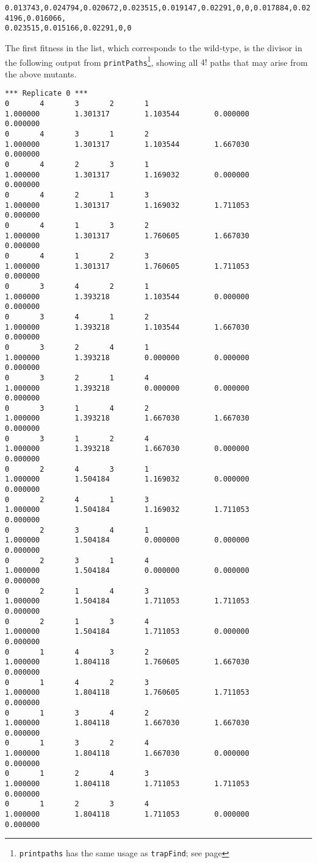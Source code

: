 \vspace{1ex}
\noindent
\texttt{0.013743,0.024794,0.020672,0.023515,0.019147,0.02291,0,0,0.017884,0.024196,0.016066,\\0.023515,0.015166,0.02291,0,0}
\vspace{1ex}


The first fitness in the list, which corresponds to the wild-type, is
the divisor in the following output from
\texttt{printPaths}\footnote{\texttt{printpaths} has the same usage as
\texttt{trapFind}; see page \pageref{trapFindCmd}}, showing all $4!$
paths that may arise from the above mutants.

\begin{verbatim}
*** Replicate 0 ***
0       4       3       2       1
1.000000        1.301317        1.103544        0.000000        0.000000
0       4       3       1       2
1.000000        1.301317        1.103544        1.667030        0.000000
0       4       2       3       1
1.000000        1.301317        1.169032        0.000000        0.000000
0       4       2       1       3
1.000000        1.301317        1.169032        1.711053        0.000000
0       4       1       3       2
1.000000        1.301317        1.760605        1.667030        0.000000
0       4       1       2       3
1.000000        1.301317        1.760605        1.711053        0.000000
0       3       4       2       1
1.000000        1.393218        1.103544        0.000000        0.000000
0       3       4       1       2
1.000000        1.393218        1.103544        1.667030        0.000000
0       3       2       4       1
1.000000        1.393218        0.000000        0.000000        0.000000
0       3       2       1       4
1.000000        1.393218        0.000000        0.000000        0.000000
0       3       1       4       2
1.000000        1.393218        1.667030        1.667030        0.000000
0       3       1       2       4
1.000000        1.393218        1.667030        0.000000        0.000000
0       2       4       3       1
1.000000        1.504184        1.169032        0.000000        0.000000
0       2       4       1       3
1.000000        1.504184        1.169032        1.711053        0.000000
0       2       3       4       1
1.000000        1.504184        0.000000        0.000000        0.000000
0       2       3       1       4
1.000000        1.504184        0.000000        0.000000        0.000000
0       2       1       4       3
1.000000        1.504184        1.711053        1.711053        0.000000
0       2       1       3       4
1.000000        1.504184        1.711053        0.000000        0.000000
0       1       4       3       2
1.000000        1.804118        1.760605        1.667030        0.000000
0       1       4       2       3
1.000000        1.804118        1.760605        1.711053        0.000000
0       1       3       4       2
1.000000        1.804118        1.667030        1.667030        0.000000
0       1       3       2       4
1.000000        1.804118        1.667030        0.000000        0.000000
0       1       2       4       3
1.000000        1.804118        1.711053        1.711053        0.000000
0       1       2       3       4
1.000000        1.804118        1.711053        0.000000        0.000000
\end{verbatim}

